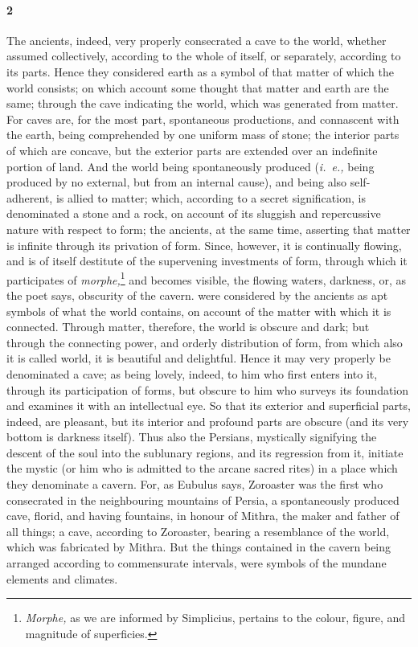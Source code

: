 \documentclass[a4paper,12pt]{article}
\begin{document}
\paragraph{2} The ancients, indeed, very properly consecrated a cave to the
world, whether assumed collectively, according to the whole of itself, or
separately, according to its parts. Hence they considered earth as a symbol of
that matter of which the world consists; on which account some thought that
matter and earth are the same; through the cave indicating the world, which was
generated from matter. For caves are, for the most part, spontaneous
productions, and connascent with the earth, being comprehended by one uniform
mass of stone; the interior parts of which are concave, but the exterior parts
are extended over an indefinite portion of land. And the world being
spontaneously produced (\textit{i.~e.,} being produced by no external, but from
an internal cause), and being also self-adherent, is allied to matter; which,
according to a secret signification, is denominated a stone and a rock, on
account of its sluggish and repercussive nature with respect to form; the
ancients, at the same time, asserting that matter is infinite through its
privation of form. Since, however, it is continually flowing, and is of itself
destitute of the supervening investments of form, through which it participates
of \textit{morphe,}\footnote{\textit{Morphe,} as we are informed by Simplicius,
pertains to the colour, figure, and magnitude of superficies.} and becomes
visible, the flowing waters, darkness, or, as the poet says, obscurity of the
cavern. were considered by the ancients as apt symbols of what the world
contains, on account of the matter with which it is connected. Through matter,
therefore, the world is obscure and dark; but through the connecting power, and
orderly distribution of form, from which also it is called world, it is
beautiful and delightful. Hence it may very properly be denominated a cave; as
being lovely, indeed, to him who first enters into it, through its
participation of forms, but obscure to him who surveys its foundation and
examines it with an intellectual eye. So that its exterior and superficial
parts, indeed, are pleasant, but its interior and profound parts are obscure
(and its very bottom is darkness itself). Thus also the Persians, mystically
signifying the descent of the soul into the sublunary regions, and its
regression from it, initiate the mystic (or him who is admitted to the arcane
sacred rites) in a place which they denominate a cavern. For, as Eubulus says,
Zoroaster was the first who consecrated in the neighbouring mountains of
Persia, a spontaneously produced cave, florid, and having fountains, in honour
of Mithra, the maker and father of all things; a cave, according to Zoroaster,
bearing a resemblance of the world, which was fabricated by Mithra. But the
things contained in the cavern being arranged according to commensurate
intervals, were symbols of the mundane elements and climates.
\end{document}

